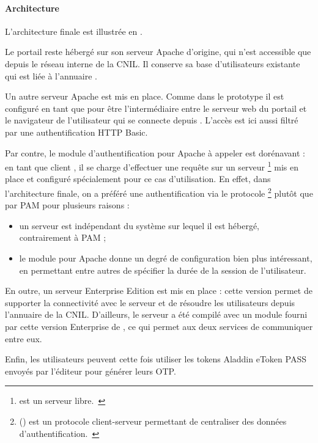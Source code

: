 \paragraph{Architecture}
L'architecture finale est illustrée en .

Le portail \aintranet{} \atypo{} reste hébergé sur son serveur Apache d'origine, qui n'est accessible que depuis le réseau interne de la CNIL.
Il conserve sa base d'utilisateurs existante qui est liée à l'annuaire \aad{}.

Un autre serveur Apache est mis en place.
Comme dans le prototype il est configuré en tant que \arp{} pour être l'intermédiaire entre le serveur web du portail et le navigateur de l'utilisateur qui se connecte depuis \ainternet{}.
L'accès est ici aussi filtré par une authentification HTTP Basic.

Par contre, le module d'authentification pour Apache à appeler est dorénavant \amodradius{} : en tant que client \aradius{}, il se charge d'effectuer une requête sur un serveur \afreerad{}\footnote{\afreerad{} est un serveur \aradius{} libre.~\cite{freeradius}} mis en place et configuré spécialement pour ce cas d'utilisation. 
En effet, dans l'architecture finale, on a préféré une authentification via le protocole \aradius{}\footnote{\aradius{} () est un protocole client-serveur permettant de centraliser des données d'authentification.~\cite{radius}} plutôt que par PAM pour plusieurs raisons :

\begin{itemize}
	\item un serveur \aradius{} est indépendant du système sur lequel il est hébergé, contrairement à PAM ;
	\item le module \amodradius{} pour Apache donne un degré de configuration bien plus intéressant, en permettant entre autres de spécifier la durée de la session de l'utilisateur.
\end{itemize}

En outre, un serveur \alinotp{} Enterprise Edition est mis en place : cette version permet de supporter la connectivité avec le serveur \aradius{} et de résoudre les utilisateurs depuis l'annuaire \aad{} de la CNIL.
D'ailleurs, le serveur \afreerad{} a été compilé avec un module fourni par cette version Enterprise de \alinotp{}, ce qui permet aux deux services de communiquer entre eux.

Enfin, les utilisateurs peuvent cette fois utiliser les tokens Aladdin eToken PASS envoyés par l'éditeur \alse{} pour générer leurs OTP.

